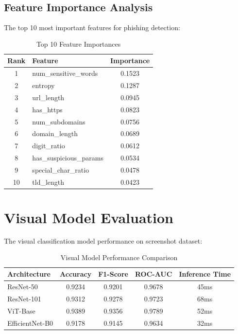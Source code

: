 \documentclass[12pt,a4paper]{report}
\begin{document}
\subsection{Feature Importance Analysis}

The top 10 most important features for phishing detection:

\begin{table}[h!]
\centering
\caption{Top 10 Feature Importances}
\label{tab:feature_importance}
\begin{tabular}{|c|l|c|}
\hline
\textbf{Rank} & \textbf{Feature} & \textbf{Importance} \\
\hline
1 & num\_sensitive\_words & 0.1523 \\
2 & entropy & 0.1287 \\
3 & url\_length & 0.0945 \\
4 & has\_https & 0.0823 \\
5 & num\_subdomains & 0.0756 \\
6 & domain\_length & 0.0689 \\
7 & digit\_ratio & 0.0612 \\
8 & has\_suspicious\_params & 0.0534 \\
9 & special\_char\_ratio & 0.0478 \\
10 & tld\_length & 0.0423 \\
\hline
\end{tabular}
\end{table}

\section{Visual Model Evaluation}

The visual classification model performance on screenshot dataset:

\begin{table}[h!]
\centering
\caption{Visual Model Performance Comparison}
\label{tab:visual_results}
\begin{tabular}{|l|c|c|c|c|}
\hline
\textbf{Architecture} & \textbf{Accuracy} & \textbf{F1-Score} & \textbf{ROC-AUC} & \textbf{Inference Time} \\
\hline
ResNet-50 & 0.9234 & 0.9201 & 0.9678 & 45ms \\
ResNet-101 & 0.9312 & 0.9278 & 0.9723 & 68ms \\
ViT-Base & 0.9389 & 0.9356 & 0.9789 & 52ms \\
EfficientNet-B0 & 0.9178 & 0.9145 & 0.9634 & 32ms \\
\hline
\end{tabular}
\end{table}
\end{document}
